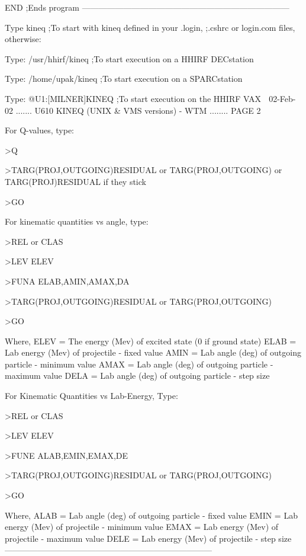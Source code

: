   END                      ;Ends program
   ---------------------------------------------------------------------------
 
   Type   kineq             ;To start with kineq defined in your .login,
                            ;.cshrc or login.com files, otherwise:
 
   Type:  /usr/hhirf/kineq  ;To start execution on a HHIRF DECstation
 
   Type:  /home/upak/kineq  ;To start execution on a SPARCstation
 
   Type: @U1:[MILNER]KINEQ  ;To start execution on the HHIRF VAX
    
   02-Feb-02 ....... U610  KINEQ (UNIX & VMS versions) - WTM ........ PAGE   2
 
 
 
   For Q-values, type:
 
   >Q
 
   >TARG(PROJ,OUTGOING)RESIDUAL  or  TARG(PROJ,OUTGOING)
                                 or  TARG(PROJ)RESIDUAL  if they stick
 
   >GO
 
 
   For kinematic quantities vs angle, type:
 
   >REL  or  CLAS
 
   >LEV  ELEV
 
   >FUNA ELAB,AMIN,AMAX,DA
 
   >TARG(PROJ,OUTGOING)RESIDUAL  or  TARG(PROJ,OUTGOING)
 
   >GO
 
   Where,
   ELEV = The energy (Mev) of excited state (0 if ground state)
   ELAB = Lab energy (Mev) of projectile        - fixed value
   AMIN = Lab angle  (deg) of outgoing particle - minimum value
   AMAX = Lab angle  (deg) of outgoing particle - maximum value
   DELA = Lab angle  (deg) of outgoing particle - step size
 
   For Kinematic Quantities vs Lab-Energy, Type:
 
   >REL  or  CLAS
 
   >LEV  ELEV
 
   >FUNE ALAB,EMIN,EMAX,DE
 
   >TARG(PROJ,OUTGOING)RESIDUAL  or  TARG(PROJ,OUTGOING)
 
   >GO
 
   Where,
   ALAB = Lab angle  (deg) of outgoing particle - fixed value
   EMIN = Lab energy (Mev) of projectile        - minimum value
   EMAX = Lab energy (Mev) of projectile        - maximum value
   DELE = Lab energy (Mev) of projectile        - step size
   ---------------------------------------------------------------------------
 
